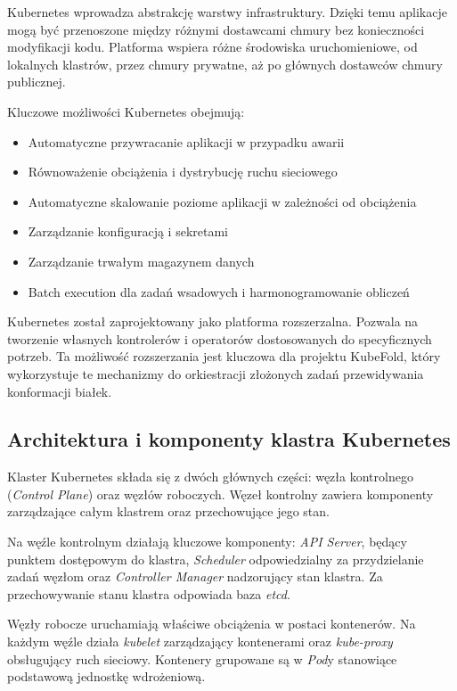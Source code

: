 Kubernetes wprowadza abstrakcję warstwy infrastruktury.
Dzięki temu aplikacje mogą być przenoszone między różnymi dostawcami chmury bez konieczności modyfikacji kodu.
Platforma wspiera różne środowiska uruchomieniowe, od lokalnych klastrów, przez chmury prywatne, aż po głównych dostawców chmury publicznej.

Kluczowe możliwości Kubernetes obejmują:
\begin{itemize}
    \item Automatyczne przywracanie aplikacji w przypadku awarii
    \item Równoważenie obciążenia i dystrybucję ruchu sieciowego
    \item Automatyczne skalowanie poziome aplikacji w zależności od obciążenia
    \item Zarządzanie konfiguracją i sekretami
    \item Zarządzanie trwałym magazynem danych
    \item Batch execution dla zadań wsadowych i harmonogramowanie obliczeń
\end{itemize}

Kubernetes został zaprojektowany jako platforma rozszerzalna.
Pozwala na tworzenie własnych kontrolerów i operatorów dostosowanych do specyficznych potrzeb.
Ta możliwość rozszerzania jest kluczowa dla projektu KubeFold, który wykorzystuje te mechanizmy do orkiestracji złożonych zadań przewidywania konformacji białek.

\subsection{Architektura i komponenty klastra Kubernetes}

Klaster Kubernetes składa się z dwóch głównych części: węzła kontrolnego (\textit{Control Plane}) oraz węzłów roboczych.
Węzeł kontrolny zawiera komponenty zarządzające całym klastrem oraz przechowujące jego stan.

Na węźle kontrolnym działają kluczowe komponenty: \textit{API Server}, będący punktem dostępowym do klastra, \textit{Scheduler} odpowiedzialny za przydzielanie zadań węzłom oraz \textit{Controller Manager} nadzorujący stan klastra.
Za przechowywanie stanu klastra odpowiada baza \textit{etcd}.

Węzły robocze uruchamiają właściwe obciążenia w postaci kontenerów.
Na każdym węźle działa \textit{kubelet} zarządzający kontenerami oraz \textit{kube-proxy} obsługujący ruch sieciowy.
Kontenery grupowane są w \textit{Pod}y stanowiące podstawową jednostkę wdrożeniową.

